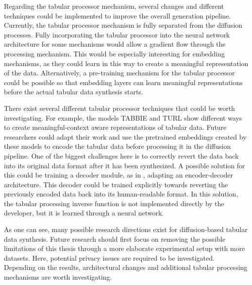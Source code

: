 Regarding the tabular processor mechanism, several changes and different techniques could be implemented to improve the overall generation pipeline.
Currently, the tabular processor mechanism is fully separated from the diffusion processes.
Fully incorporating the tabular processor into the neural network architecture for some mechanisms would allow a gradient flow through the processing mechanism.
This would be especially interesting for embedding mechanisms, as they could learn in this way to create a meaningful representation of the data.
Alternatively, a pre-training mechanism for the tabular processor could be possible so that embedding layers can learn meaningful representations before the actual tabular data synthesis starts.

There exist several different tabular processor techniques that could be worth investigating.
For example, the models TABBIE \cite{iida2021TABBIEPretrainedRepresentations} and TURL \cite{deng2021TURLTableUnderstanding} show different ways to create
meaningful-context aware representations of tabular data.
Future researchers could adapt their work and use the pretrained embeddings created by these models to encode the tabular data before processing it in the diffusion pipeline.
One of the biggest challenges here is to correctly revert the data back into its original data format after it has been synthesized.
A possible solution for this could be training a decoder module, as in \cite{rombach2022HighResolutionImageSynthesis}, adapting an encoder-decoder architecture.
This decoder could be trained explicitly towards reverting the previously encoded data back into its human-readable format.
In this solution, the tabular processing inverse function is not implemented directly by the developer, but it is learned through a neural network.

As one can see, many possible research directions exist for diffusion-based tabular data synthesis.
Future research should first focus on removing the possible limitations of this thesis through a more elaborate experimental setup with more datasets.
Here, potential privacy issues are required to be investigated.
Depending on the results, architectural changes and additional tabular processing mechanisms are worth investigating.